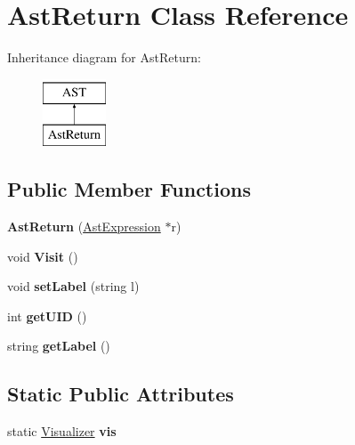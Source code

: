 \hypertarget{classAstReturn}{\section{Ast\-Return Class Reference}
\label{classAstReturn}
}
Inheritance diagram for Ast\-Return\-:\begin{figure}[H]
\begin{center}
\leavevmode
\includegraphics[height=2.000000cm]{classAstReturn}
\end{center}
\end{figure}
\subsection*{Public Member Functions}
\begin{DoxyCompactItemize}
\item 
\hypertarget{classAstReturn_a8501045c949a42680c1fe7553473fc8a}{{\bfseries Ast\-Return} (\hyperlink{classAstExpression}{Ast\-Expression} $\ast$r)}\label{classAstReturn_a8501045c949a42680c1fe7553473fc8a}

\item 
\hypertarget{classAstReturn_a220df2fba1ee6802b89f55d16821b6ea}{void {\bfseries Visit} ()}\label{classAstReturn_a220df2fba1ee6802b89f55d16821b6ea}

\item 
\hypertarget{classAST_a71d680856e95ff89f55d5311a552eba6}{void {\bfseries set\-Label} (string l)}\label{classAST_a71d680856e95ff89f55d5311a552eba6}

\item 
\hypertarget{classAST_ab7a5b1d9f1c2de0d98deb356f724a42c}{int {\bfseries get\-U\-I\-D} ()}\label{classAST_ab7a5b1d9f1c2de0d98deb356f724a42c}

\item 
\hypertarget{classAST_aee029be902fffc927d16ccb03eb922ad}{string {\bfseries get\-Label} ()}\label{classAST_aee029be902fffc927d16ccb03eb922ad}

\end{DoxyCompactItemize}
\subsection*{Static Public Attributes}
\begin{DoxyCompactItemize}
\item 
\hypertarget{classAST_aca9e6637209b31e03a09c0d42f29bdfa}{static \hyperlink{classVisualizer}{Visualizer} {\bfseries vis}}\label{classAST_aca9e6637209b31e03a09c0d42f29bdfa}

\end{DoxyCompactItemize}
